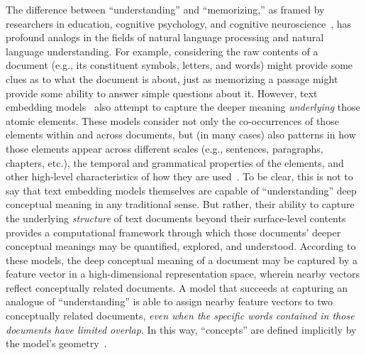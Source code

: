 \documentclass[10pt]{article}
\begin{document}
The difference between ``understanding'' and ``memorizing,'' as framed
by researchers in education, cognitive psychology, and cognitive
neuroscience~\citep[e.g.,][]{Kato40, Gall00, ScotEtal07, HallGree08,
  Macl05}, has profound analogs in the fields of natural language
processing and natural language understanding. For example,
considering the raw contents of a document (e.g., its constituent
symbols, letters, and words) might provide some clues as to what the
document is about, just as memorizing a passage might provide some
ability to answer simple questions about it. However, text embedding
models~\citep[e.g.,][]{LandDuma97, DeerEtal90, BleiEtal03,
  BleiLaff06, MikoEtal13a, CerEtal18, BrowEtal20, ViswEtal17} also
attempt to capture the deeper meaning \textit{underlying} those atomic
elements. These models consider not only the co-occurrences of those
elements within and across documents, but (in many cases) also
patterns in how those elements appear across different scales (e.g.,
sentences, paragraphs, chapters, etc.), the temporal and grammatical
properties of the elements, and other high-level characteristics of
how they are used~\citep{Mann23b, Mann21a}.
To be clear, this is not to say that text embedding models themselves
are capable of ``understanding'' deep conceptual meaning in any
traditional sense. But rather, their ability to capture the underlying
\textit{structure} of text documents beyond their surface-level contents
provides a computational framework through which those documents'
deeper conceptual meanings may be quantified, explored, and understood.
According to these models,
the deep conceptual meaning of a document may be captured by a feature
vector in a high-dimensional representation space, wherein nearby
vectors reflect conceptually related documents. A model that succeeds
at capturing an analogue of ``understanding'' is able to assign nearby
feature vectors to two conceptually related documents, \textit{even
  when the specific words contained in those documents have limited
  overlap}. In this way, ``concepts'' are defined implicitly by the
model's geometry~\citep[e.g., how the embedding coordinate of a given
word or document relates to the coordinates of other text
embeddings; ][]{PianHill22}.
\end{document}
